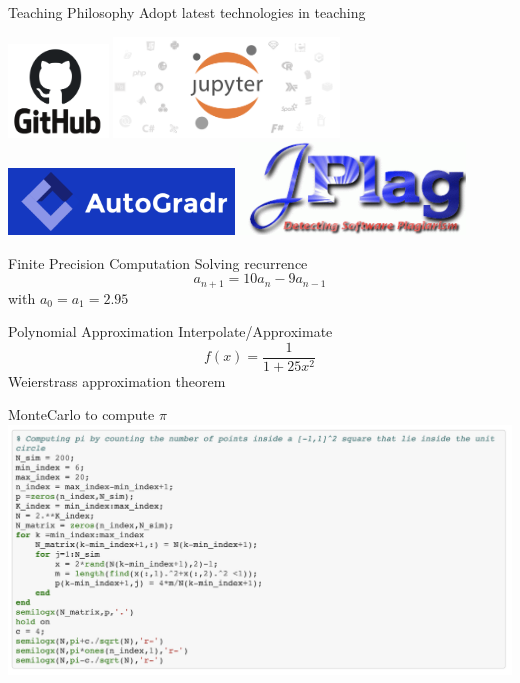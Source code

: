 \documentclass{beamer}
\begin{document}
\begin{frame}[c]{Teaching Philosophy}
	\LARGE
	Adopt latest technologies in teaching
	\begin{center}
	\includegraphics[width=0.2\textwidth]{./images/Github.png} \hspace{1em}
	\includegraphics[width=0.45\textwidth]{./images/Jupyter.png}\\
	\vspace{1em}
	\includegraphics[width=0.45\textwidth]{./images/AutoGradr.png} \hspace{1em}
	\includegraphics[width=0.45\textwidth]{./images/JPlag.png}
	\end{center}
\end{frame}

\begin{frame}{Finite Precision Computation}
	\LARGE
	Solving recurrence
	$$a_{n+1} = 10a_n - 9a_{n-1}$$
	with $a_0 = a_1 = 2.95$
\end{frame}

\begin{frame}{Polynomial Approximation}
	\LARGE
	Interpolate/Approximate
	$$f(x) = \dfrac1{1+25x^2}$$
	Weierstrass approximation theorem
\end{frame}

\begin{frame}{MonteCarlo to compute $\pi$}
	\includegraphics[width=\textwidth]{./images/pi_1.png}
\end{frame}
\end{document}
